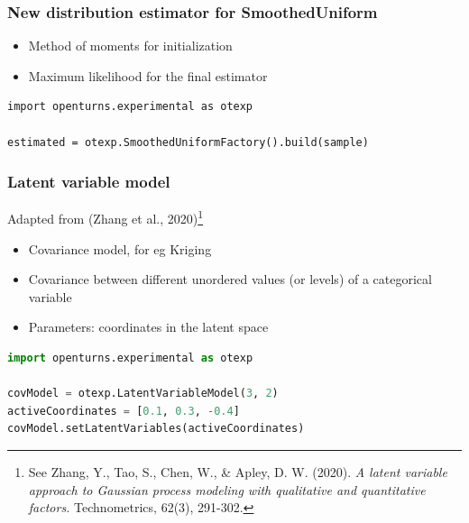 \documentclass[aspectratio=169]{beamer}
\begin{document}
\begin{frame}[containsverbatim]
\frametitle{New distribution estimator for SmoothedUniform}

\begin{itemize}
\item Method of moments for initialization
\item Maximum likelihood for the final estimator
\end{itemize}


\begin{small}
\lstset{language=python}
\begin{lstlisting}
import openturns.experimental as otexp

estimated = otexp.SmoothedUniformFactory().build(sample)
\end{lstlisting}
\end{small}

\end{frame}


\begin{frame}[containsverbatim]
\frametitle{Latent variable model}

Adapted from (Zhang et al., 2020)\footnote{See Zhang, Y., Tao, S., Chen, W., 
\& Apley, D. W. (2020). \emph{A latent variable approach to Gaussian process modeling 
with qualitative and quantitative factors.} Technometrics, 62(3), 291-302.}
\begin{itemize}
\item Covariance model, for eg Kriging
\item Covariance between different unordered values (or levels) of a categorical variable
\item Parameters: coordinates in the latent space
\end{itemize}

\vspace{30pt}

\begin{small}
\begin{lstlisting}[language=Python]
import openturns.experimental as otexp

covModel = otexp.LatentVariableModel(3, 2)
activeCoordinates = [0.1, 0.3, -0.4]
covModel.setLatentVariables(activeCoordinates)
\end{lstlisting}
\end{small}

\end{frame}
\end{document}
